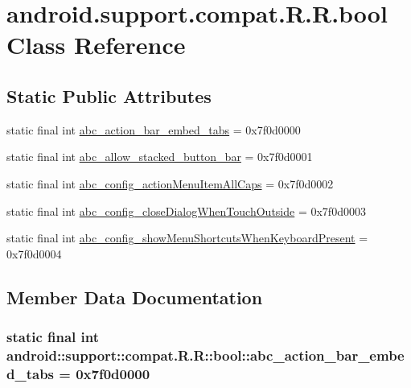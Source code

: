 \hypertarget{classandroid_1_1support_1_1compat_1_1_r_1_1bool}{
\section{android.support.compat.R.R.bool Class Reference}
\label{classandroid_1_1support_1_1compat_1_1_r_1_1bool}
}
\subsection*{Static Public Attributes}
\begin{CompactItemize}
\item 
static final int \hyperlink{classandroid_1_1support_1_1compat_1_1_r_1_1bool_a4e3ecceb73d35848050c78fb9c7f2e2}{abc\_\-action\_\-bar\_\-embed\_\-tabs} = 0x7f0d0000
\item 
static final int \hyperlink{classandroid_1_1support_1_1compat_1_1_r_1_1bool_c1c65ce0082a1819dd9a2c9d268c90b6}{abc\_\-allow\_\-stacked\_\-button\_\-bar} = 0x7f0d0001
\item 
static final int \hyperlink{classandroid_1_1support_1_1compat_1_1_r_1_1bool_dbd84d6810343e95029803b05efb6851}{abc\_\-config\_\-actionMenuItemAllCaps} = 0x7f0d0002
\item 
static final int \hyperlink{classandroid_1_1support_1_1compat_1_1_r_1_1bool_327a93964eec457ab2ec7f2c68a15f18}{abc\_\-config\_\-closeDialogWhenTouchOutside} = 0x7f0d0003
\item 
static final int \hyperlink{classandroid_1_1support_1_1compat_1_1_r_1_1bool_c3a3300fbd75272ad1d466c264cb7713}{abc\_\-config\_\-showMenuShortcutsWhenKeyboardPresent} = 0x7f0d0004
\end{CompactItemize}


\subsection{Member Data Documentation}
\hypertarget{classandroid_1_1support_1_1compat_1_1_r_1_1bool_a4e3ecceb73d35848050c78fb9c7f2e2}{
\subsubsection[{abc\_\-action\_\-bar\_\-embed\_\-tabs}]{\setlength{\rightskip}{0pt plus 5cm}static final int android::support::compat.R.R::bool::abc\_\-action\_\-bar\_\-embed\_\-tabs = 0x7f0d0000}}
\label{classandroid_1_1support_1_1compat_1_1_r_1_1bool_a4e3ecceb73d35848050c78fb9c7f2e2}


